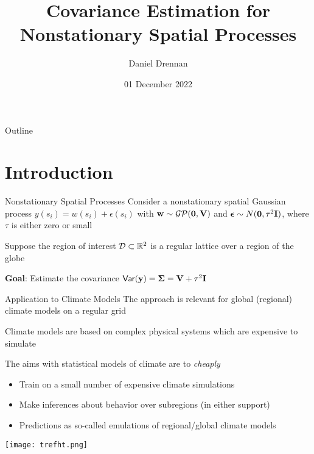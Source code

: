 \documentclass[letterpaper, 10pt, compress]{beamer}
\title[STAT 647 Project Presentation]{Covariance Estimation for Nonstationary Spatial Processes}
\author[Drennan]{Daniel Drennan}
\institute[TAMU Stats]{Department of Statistics\\Texas A\&M University}
\date{01 December 2022}
\begin{document}
\begin{frame}[plain]
    \titlepage
\end{frame}

\begin{frame}{Outline}
    \tableofcontents
\end{frame}


\section[Intro]{Introduction}

\begin{frame}{Nonstationary Spatial Processes}
    Consider a nonstationary spatial Gaussian process $y(s_i) = w(s_i) + \epsilon(s_i)$
    with $\mathbf{w} \sim \mathcal{GP}(\mathbf{0}, \mathbf{V})$ and $\boldsymbol{\epsilon} \sim N(\mathbf{0}, \tau^2\mathbf{I})$,
    where $\tau$ is either zero or small
    \medskip\par

    Suppose the region of interest $\mathcal{D} \subset \mathbb{R}^{2}$ is a regular lattice
    over a region of the globe
    \medskip\par

    \textbf{Goal}: Estimate the covariance $\mathsf{Var}(\mathbf{y}) = \boldsymbol{\Sigma} = \mathbf{V} + \tau^2\mathbf{I}$
\end{frame}

\begin{frame}{Application to Climate Models}
    The approach is relevant for global (regional) climate models on a regular grid
    \medskip\par

    Climate models are based on complex physical systems which are expensive to simulate
    \medskip\par

    The aims with statistical models of climate are to \emph{cheaply}
    \begin{itemize}
        \item Train on a small number of expensive climate simulations
        \item Make inferences about behavior over subregions (in either support)
        \item Predictions as so-called emulations of regional/global climate models
    \end{itemize}
    
    \begin{center}
    \texttt{[image: trefht.png]}
    \end{center}
\end{frame}
\end{document}
